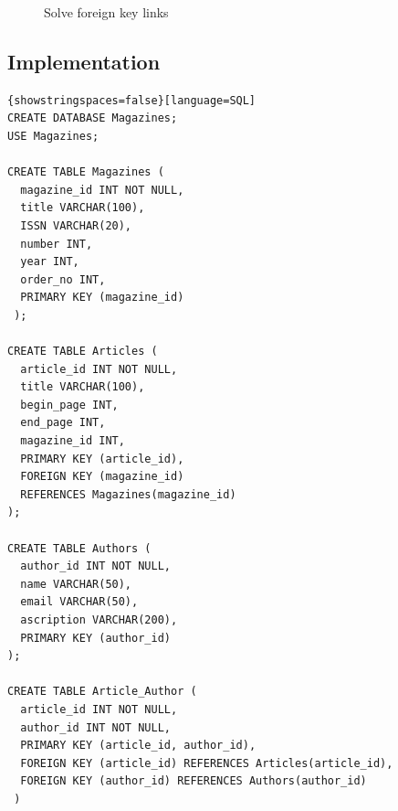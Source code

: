 \documentclass{article}
\begin{document}
\begin{itemize}
\begin{figure}[h]
\caption{Solve foreign key links}
\end{figure}
\end{itemize}
\newpage
\subsection{Implementation}
\begin{lstlisting}{showstringspaces=false}[language=SQL]
CREATE DATABASE Magazines;
USE Magazines;

CREATE TABLE Magazines (
  magazine_id INT NOT NULL,
  title VARCHAR(100),
  ISSN VARCHAR(20),
  number INT,
  year INT,
  order_no INT,
  PRIMARY KEY (magazine_id)
 );
  
CREATE TABLE Articles (
  article_id INT NOT NULL,
  title VARCHAR(100),
  begin_page INT,
  end_page INT,
  magazine_id INT,
  PRIMARY KEY (article_id),
  FOREIGN KEY (magazine_id)
  REFERENCES Magazines(magazine_id)
);

CREATE TABLE Authors (
  author_id INT NOT NULL,
  name VARCHAR(50),
  email VARCHAR(50),
  ascription VARCHAR(200),
  PRIMARY KEY (author_id)
);
  
CREATE TABLE Article_Author (
  article_id INT NOT NULL,
  author_id INT NOT NULL,
  PRIMARY KEY (article_id, author_id),
  FOREIGN KEY (article_id) REFERENCES Articles(article_id),
  FOREIGN KEY (author_id) REFERENCES Authors(author_id)
 )
    
\end{lstlisting}
\end{document}
